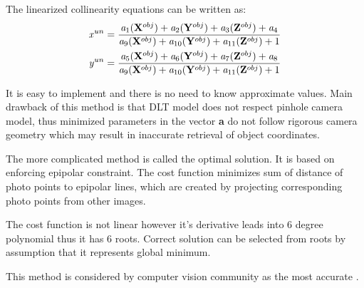 \documentclass[a4paper,12pt]{article}
\newcommand{\evect}[1]{
{\bf #1}
}
\newcommand{\escal}[1]{
{\it #1}
}
\begin{document}
The linearized collinearity equations can be written as:  
\begin{equation}
\label{eq:col_eqs}
\begin{split}
&\escal{x}^{un} = \frac{\escal{a}_{1}(\evect{X}^{obj}) + 
                                  \escal{a}_{2}(\evect{Y}^{obj}) + 
                                  \escal{a}_{3}(\evect{Z}^{obj}) +
                                  \escal{a}_{4}
                                  }{
				  \escal{a}_{9}(\evect{X}^{obj}) + 
                                  \escal{a}_{10}(\evect{Y}^{obj}) + 
                                  \escal{a}_{11}(\evect{Z}^{obj}) +
                                   1  
                                  } \\
&\escal{y}^{un} = \frac{\escal{a}_{5}(\evect{X}^{obj}) + 
                                  \escal{a}_{6}(\evect{Y}^{obj}) + 
                                  \escal{a}_{7}(\evect{Z}^{obj}) +                                 
                                  \escal{a}_{8}
                                  }{
				  \escal{a}_{9}(\evect{X}^{obj}) + 
                                  \escal{a}_{10}(\evect{Y}^{obj}) + 
                                  \escal{a}_{11}(\evect{Z}^{obj}) +    
                                  1
                                  }
\end{split}
\end{equation}
 

It is easy to implement and 
there is no need to know approximate values. 
Main drawback of this method is that DLT model does not respect pinhole camera model, thus
minimized parameters in the vector \evect{a} do not follow rigorous camera geometry which 
may result in inaccurate retrieval of object coordinates.


The more complicated method is called the optimal solution. 
It is based on enforcing epipolar constraint.  The cost function 
minimizes sum of distance of photo points to epipolar lines, which are created 
by projecting corresponding photo points from other images.

The cost function is not linear however it's derivative leads into 6 degree polynomial thus 
it has 6 roots. Correct solution can be selected from roots by assumption that it represents global minimum. 

This method is considered by computer vision community as the most accurate \cite[p. 315]{Hartley2004}.  
\end{document}

